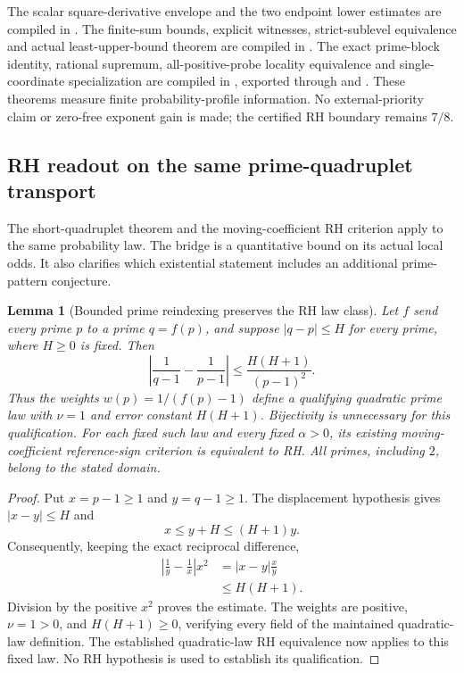\documentclass[11pt]{article}
\newtheorem{lemma}[theorem]{Lemma}
\theoremstyle{definition}
\begin{document}
\begin{flushleft}
The scalar square-derivative envelope and the two endpoint
lower estimates are compiled in
.
The finite-sum bounds, explicit witnesses, strict-sublevel
equivalence and actual least-upper-bound theorem are compiled in
.
The exact prime-block identity, rational supremum, all-positive-probe
locality equivalence and single-coordinate specialization are
compiled in
,
exported through 
and .
These theorems measure finite probability-profile information.
No external-priority claim or zero-free exponent gain is made;
the certified RH boundary remains $7/8$.
\end{flushleft}


\clearpage
\subsection{RH readout on the same prime-quadruplet transport}

The short-quadruplet theorem and the moving-coefficient RH criterion
apply to the same probability law. The bridge is a quantitative
bound on its actual local odds. It also clarifies which existential
statement includes an additional prime-pattern conjecture.

\begin{lemma}[Bounded prime reindexing preserves the RH law class]
Let $f$ send every prime $p$ to a prime $q=f(p)$, and suppose
$|q-p|\le H$ for every prime, where $H\ge0$ is fixed. Then
\[
 \left|\frac1{q-1}-\frac1{p-1}\right|
 \le \frac{H(H+1)}{(p-1)^2}.
\]
Thus the weights $w(p)=1/(f(p)-1)$ define a qualifying quadratic
prime law with $\nu=1$ and error constant $H(H+1)$.
Bijectivity is unnecessary for this qualification.
For each fixed such law and every fixed $\alpha>0$, its existing
moving-coefficient reference-sign criterion is equivalent to RH.
All primes, including $2$, belong to the stated domain.
\end{lemma}

\begin{proof}
Put $x=p-1\ge1$ and $y=q-1\ge1$. The displacement hypothesis gives
$|x-y|\le H$ and
\[
 x\le y+H\le(H+1)y.
\]
Consequently, keeping the exact reciprocal difference,
\[
 \begin{split}
 \left|\frac1y-\frac1x\right|x^2
   &=|x-y|\frac{x}{y}\\
   &\le H(H+1).
 \end{split}
\]
Division by the positive $x^2$ proves the estimate. The weights
are positive, $\nu=1>0$, and $H(H+1)\ge0$, verifying every field
of the maintained quadratic-law definition. The established
quadratic-law RH equivalence now applies to this fixed law.
No RH hypothesis is used to establish its qualification.
\end{proof}
\end{document}
